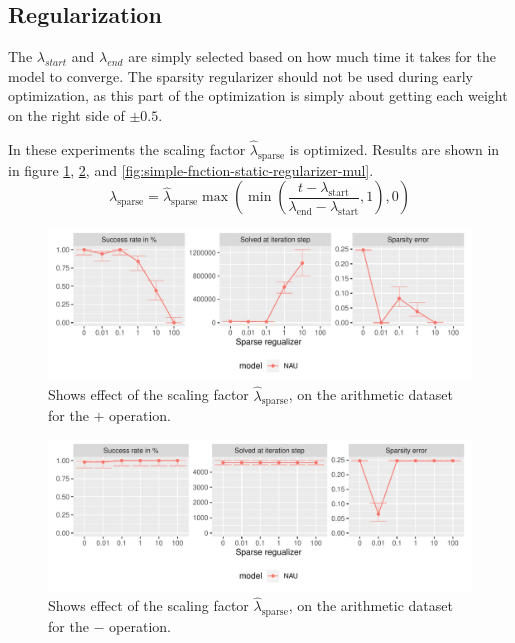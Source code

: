 \subsection{Regularization}
\label{sec:appendix:simple-function-task:regualization}

The $\lambda_{start}$ and $\lambda_{end}$ are simply selected based on how much time it takes for the model to converge. The sparsity regularizer should not be used during early optimization, as this part of the optimization is simply about getting each weight on the right side of $\pm 0.5$.

In these experiments the scaling factor $\hat{\lambda}_{\mathrm{sparse}}$ is optimized. 
Results are shown in in figure \ref{fig:simple-fnction-static-regularizer-add}, \ref{fig:simple-fnction-static-regularizer-sub}, and \ref{fig:simple-fnction-static-regularizer-mul}.
\begin{equation}
\lambda_{\mathrm{sparse}} = \hat{\lambda}_{\mathrm{sparse}} \max(\min(\frac{t - \lambda_{\mathrm{start}}}{\lambda_{\mathrm{end}} - \lambda_{\mathrm{start}}}, 1), 0)
\end{equation}

\begin{figure}[H]
\centering
\includegraphics[width=\linewidth]{results/simple_function_static_regualization_add.pdf}
\caption{Shows effect of the scaling factor $\hat{\lambda}_{\mathrm{sparse}}$, on the arithmetic dataset for the $\bm{+}$ operation.}
\label{fig:simple-fnction-static-regularizer-add}
\end{figure}

\begin{figure}[H]
\centering
\includegraphics[width=\linewidth]{results/simple_function_static_regualization_sub.pdf}
\caption{Shows effect of the scaling factor $\hat{\lambda}_{\mathrm{sparse}}$, on the arithmetic dataset for the $\bm{-}$ operation.}
\label{fig:simple-fnction-static-regularizer-sub}
\end{figure}

